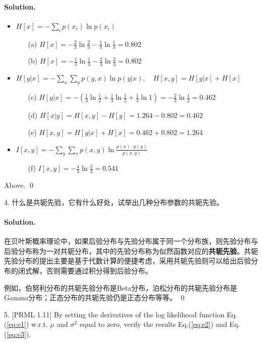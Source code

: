\documentclass[a4paper, utf8]{ctexart}
\newenvironment{solution}
{\color{blue} \paragraph{Solution.}}
{\newline \qed}
\begin{document}
\begin{solution}
\begin{itemize}

    \item $H[x] = -\sum_i p(x_i)\ln p(x_i)$
    \begin{itemize}
    	\item[(a)] $H[x] = -\frac{2}{3}\ln\frac{2}{3} - \frac{1}{3}\ln\frac{1}{3}  = 0.802$
    	\item[(b)] $H[x] = - \frac{1}{3}\ln\frac{1}{3} - \frac{2}{3}\ln\frac{2}{3} = 0.802$
    \end{itemize}
    \item $H[y|x] = -\sum_x \sum_y p(y, x) \ln p(y|x),\quad H[x,y] = H[y|x] + H[x]$
    \begin{itemize}
    	\item[(c)] $H[y|x] = -(\frac{1}{3}\ln\frac{1}{2} + \frac{1}{3}\ln\frac{1}{2} + \frac{1}{3}\ln 1) = -\frac{2}{3}\ln\frac{1}{2} = 0.462$
    	\item[(d)] $H[x | y] = H[x, y] - H[y] = 1.264 - 0.802 = 0.462$
    	\item[(e)] $H[x, y] = H[y|x] + H[x] = 0.462 + 0.802 = 1.264$
    \end{itemize}
    \item $I[x,y] = -\sum_y \sum_x p(x, y)\ln \frac{p(x)\cdot p(y)}{p(x,y)}$
    \begin{itemize}
    	\item[(f)] $I[x, y] = -\frac{4}{3}\ln \frac{2}{3} = 0.541$
    \end{itemize}
\end{itemize}
    Above.
\end{solution}

4. 什么是共轭先验，它有什么好处，试举出几种分布参数的共轭先验。
\begin{solution}
    在贝叶斯概率理论中，如果后验分布与先验分布属于同一个分布族，则先验分布与后验分布称为一对共轭分布，其中的先验分布称为似然函数对应的\textbf{共轭先验}。共轭先验分布的提出主要是基于代数计算的便捷考虑，采用共轭先验则可以给出后验分布的闭式解，否则需要通过积分得到后验分布。
    
    例如，伯努利分布的共轭先验分布是Beta分布，泊松分布的共轭先验分布是Gamma分布；正态分布的共轭先验仍是正态分布等等。
\end{solution}

5. {\color{red} [PRML 1.11]} By setting the derivatives of the log likelihood function Eq.(\ref{eq:e1}) w.r.t. $\mu$ and $\sigma^2$ equal to zero, verify the results Eq.(\ref{eq:e2}) and Eq.(\ref{eq:e3}).
\end{document}
